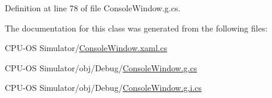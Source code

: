 Definition at line 78 of file Console\+Window.\+g.\+cs.



The documentation for this class was generated from the following files\+:\begin{DoxyCompactItemize}
\item 
C\+P\+U-\/\+O\+S Simulator/\hyperlink{_console_window_8xaml_8cs}{Console\+Window.\+xaml.\+cs}\item 
C\+P\+U-\/\+O\+S Simulator/obj/\+Debug/\hyperlink{_console_window_8g_8cs}{Console\+Window.\+g.\+cs}\item 
C\+P\+U-\/\+O\+S Simulator/obj/\+Debug/\hyperlink{_console_window_8g_8i_8cs}{Console\+Window.\+g.\+i.\+cs}\end{DoxyCompactItemize}
